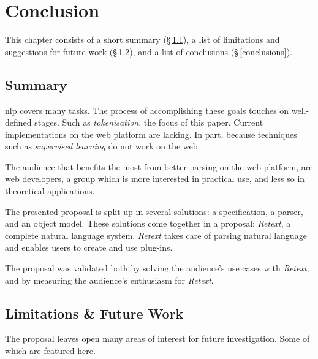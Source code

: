 \chapter{Conclusion}\label{conclusion}

This chapter consists of a short summary (§\,\ref{summary}), a list of
  limitations and suggestions for future work
  (§\,\ref{limitations-future-work}), and a list of conclusions
  (§\,\ref{conclusions}).

\section{Summary}\label{summary}

\gls{nlp} covers many tasks.
The process of accomplishing these goals touches on well-defined stages.
Such as \emph{tokenisation}, the focus of this paper.
Current implementations on the web platform are lacking.
In part, because techniques such as \emph{supervised learning} do not work
  on the web.

The audience that benefits the most from better parsing on the web platform,
  are web developers, a group which is more interested in practical use, and
  less so in theoretical applications.

The presented proposal is split up in several solutions: a specification, a
  parser, and an object model.
These solutions come together in a proposal: \emph{Retext}, a complete natural
  language system.
\emph{Retext} takes care of parsing natural language and enables users to
  create and use plug-ins.

The proposal was validated both by solving the audience's use cases with
  \emph{Retext}, and by measuring the audience's enthusiasm for \emph{Retext}.

\section{Limitations \& Future Work}\label{limitations-future-work}

The proposal leaves open many areas of interest for future investigation.
Some of which are featured here.

